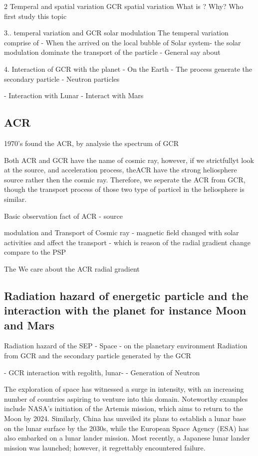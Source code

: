 2 Temperal and spatial variation
	GCR spatial variation
		What is ?
		Why?
		Who first study this topic 
	

3..  temperal variation and GCR solar modulation 
	 The temperal variation comprise of 
	- When the arrived on the local bubble of Solar system- the solar modulation dominate the transport of the particle - General say about 

4.  Interaction of GCR with the planet
	- On the Earth 
		- The process generate the secondary particle
		- Neutron particles	
		
		
	- Interaction with Lunar
	- Interact with Mars 

   


\subsection{ACR}
 1970's found the ACR, by analysie the spectrum of GCR


Both ACR and GCR have the name of cosmic ray, however, if we strictfullyt look at the source, and acceleration process, theACR have the strong heliosphere source rather then the cosmic ray.
Therefore, we seperate the ACR from GCR, though the transport process of those two type of particel in the heliosphere is similar.

Basic observation fact of ACR
- source 

modulation and Transport of Cosmic ray - magnetic field changed with solar activities and affect the transport -  which is reason of the radial gradient change compare to the PSP 

The 
We care about the ACR radial gradient



\subsection{Radiation hazard of energetic particle and the interaction with the planet for instance Moon and Mars}

Radiation hazard of the SEP 
- Space
- on the planetary environment
Radiation from GCR and the secondary particle generated by the GCR

- GCR interaction with regolith, lunar-
	- Generation of Neutron

The exploration of space has witnessed a surge in intensity, with an increasing number of countries aspiring to venture into this domain. Noteworthy examples include NASA's initiation of the Artemis mission, which aims to return to the Moon by 2024. Similarly, China has unveiled its plans to establish a lunar base on the lunar surface by the 2030s, while the European Space Agency (ESA) has also embarked on a lunar lander mission. Most recently, a Japanese lunar lander mission was launched; however, it regrettably encountered failure.

